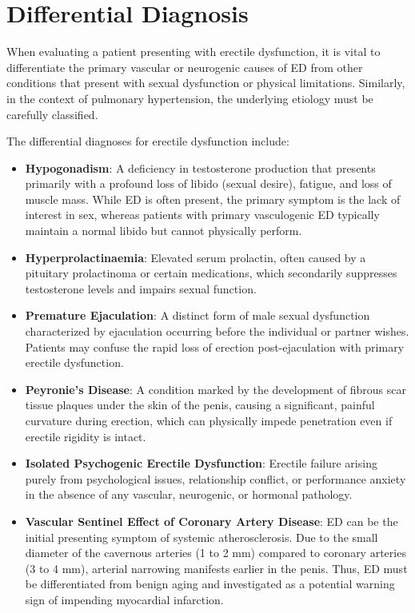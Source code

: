 \section*{Differential Diagnosis}
When evaluating a patient presenting with erectile dysfunction, it is vital to differentiate the primary vascular or neurogenic causes of ED from other conditions that present with sexual dysfunction or physical limitations. Similarly, in the context of pulmonary hypertension, the underlying etiology must be carefully classified.

The differential diagnoses for erectile dysfunction include:
\begin{itemize}
    \item \textbf{Hypogonadism}: A deficiency in testosterone production that presents primarily with a profound loss of libido (sexual desire), fatigue, and loss of muscle mass. While ED is often present, the primary symptom is the lack of interest in sex, whereas patients with primary vasculogenic ED typically maintain a normal libido but cannot physically perform.
    \item \textbf{Hyperprolactinaemia}: Elevated serum prolactin, often caused by a pituitary prolactinoma or certain medications, which secondarily suppresses testosterone levels and impairs sexual function.
    \item \textbf{Premature Ejaculation}: A distinct form of male sexual dysfunction characterized by ejaculation occurring before the individual or partner wishes. Patients may confuse the rapid loss of erection post-ejaculation with primary erectile dysfunction.
    \item \textbf{Peyronie's Disease}: A condition marked by the development of fibrous scar tissue plaques under the skin of the penis, causing a significant, painful curvature during erection, which can physically impede penetration even if erectile rigidity is intact.
    \item \textbf{Isolated Psychogenic Erectile Dysfunction}: Erectile failure arising purely from psychological issues, relationship conflict, or performance anxiety in the absence of any vascular, neurogenic, or hormonal pathology.
    \item \textbf{Vascular Sentinel Effect of Coronary Artery Disease}: ED can be the initial presenting symptom of systemic atherosclerosis. Due to the small diameter of the cavernous arteries (1 to 2 mm) compared to coronary arteries (3 to 4 mm), arterial narrowing manifests earlier in the penis. Thus, ED must be differentiated from benign aging and investigated as a potential warning sign of impending myocardial infarction.
\end{itemize}

